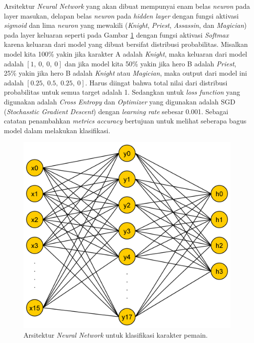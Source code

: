 Arsitektur \textit{Neural Network} yang akan dibuat mempunyai enam belas \textit{neuron} pada layer masukan, delapan belas \textit{neuron} pada \textit{hidden layer} dengan fungsi aktivasi \textit{sigmoid} dan lima \textit{neuron} yang mewakili (\textit{Knight}, \textit{Priest}, \textit{Assassin}, dan \textit{Magician}) pada layer keluaran seperti pada Gambar \ref{fig:nn_player} dengan fungsi aktivasi \textit{Softmax} karena keluaran dari model yang dibuat bersifat distribusi probabilitas. Misalkan model kita 100\% yakin jika karakter A adalah \textit{Knight}, maka keluaran dari model adalah $\left[1,\ 0,\ 0,\ 0 \right]$ dan jika model kita 50\% yakin jika hero B adalah \textit{Priest}, 25\% yakin jika hero B adalah \textit{Knight} atau \textit{Magician}, maka output dari model ini adalah $\left[0.25,\ 0.5,\ 0.25, \ 0 \right]$. Harus diingat bahwa total nilai dari distribusi probabilitas untuk semua target adalah 1. Sedangkan untuk \textit{loss function} yang digunakan adalah \textit{Cross Entropy} dan \textit{Optimizer} yang digunakan adalah SGD (\textit{Stochasstic Gradient Descent}) dengan \textit{learning rate} sebesar 0.001. Sebagai catatan penambahkan \textit{metrics accuracy} bertujuan untuk melihat seberapa bagus model dalam melakukan klasifikasi.
\vspace{1ex}

\begin{figure} [!h] \centering
	\includegraphics[scale=0.08]{img/nn_player_character.png}
	\caption{Arsitektur \textit{Neural Network} untuk klasifikasi karakter pemain.}
	\label{fig:nn_player}
	\vspace{1ex}
\end{figure}

